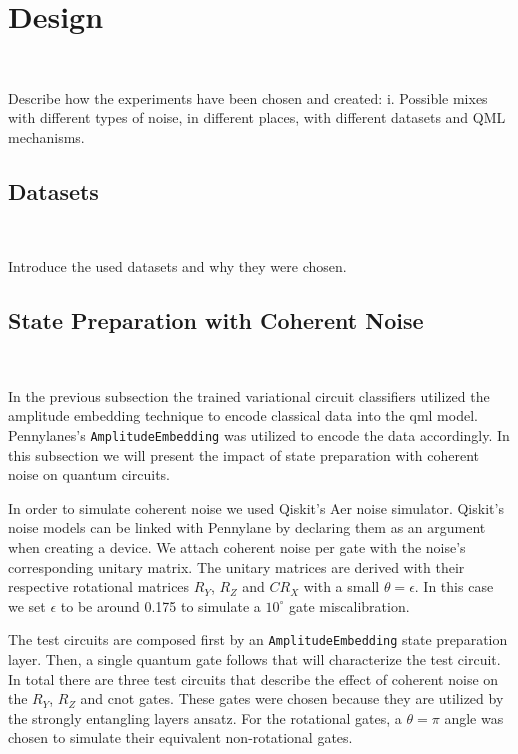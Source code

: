 \chapter{Design}\label{chapter:design} \

Describe how the experiments have been chosen and created:
  i.	Possible mixes with different types of noise, in different places, with different datasets and QML mechanisms.

\section{Datasets}\label{section:datasets} \

Introduce the used datasets and why they were chosen. \

\section{State Preparation with Coherent Noise}\label{section:state_preparation_noise} \

In the previous subsection the trained variational circuit classifiers
utilized the amplitude embedding technique to encode classical data
into the \ac{qml} model. Pennylanes's \colorbox{inline_gray}{\lstinline|AmplitudeEmbedding|}
was utilized to encode the data accordingly. In this subsection we will
present the impact of state preparation with coherent noise on quantum
circuits. \

In order to simulate coherent noise we used Qiskit's Aer noise simulator.
Qiskit's noise models can be linked with Pennylane by declaring them as
an argument when creating a device. We attach coherent noise per gate
with the noise's corresponding unitary matrix. The unitary matrices are
derived with their respective rotational matrices \(R_{Y}\), \(R_{Z}\) and 
\(CR_{X}\) with a small \(\theta = \epsilon\). In this case we set 
\(\epsilon\) to be around 0.175 to simulate a \(10^{\circ}\) gate
miscalibration. \

The test circuits are composed first by an
\colorbox{inline_gray}{\lstinline|AmplitudeEmbedding|} state preparation
layer. Then, a single quantum gate follows that will characterize the
test circuit. In total there are three test circuits that describe the
effect of coherent noise on the \(R_{Y}\), \(R_{Z}\) and \ac{cnot} gates.
These gates were chosen because they are utilized by the strongly
entangling layers ansatz. For the rotational gates, a \(\theta = \pi\)
angle was chosen to simulate their equivalent non-rotational gates.\

